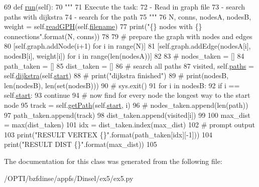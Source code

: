 \begin{DoxyCode}
69     \textcolor{keyword}{def }\hyperlink{classex5_1_1Dijsktra_aea7ae3d54e417bfbae33810b4af4b43f}{run}(self):
70         \textcolor{stringliteral}{"""}
71 \textcolor{stringliteral}{        Execute the task:}
72 \textcolor{stringliteral}{        - Read in graph file}
73 \textcolor{stringliteral}{        - search paths with dijkstra}
74 \textcolor{stringliteral}{        - search for the path}
75 \textcolor{stringliteral}{        """}
76         N, conns, nodesA, nodesB, weight = self.\hyperlink{classex5_1_1Dijsktra_a18db63176ac6b4f62a9cdf065ae12059}{readGPH}(self.\hyperlink{classex5_1_1Dijsktra_a8dbe32a7b317f625e654e87934e5200d}{filename})
77         print(\textcolor{stringliteral}{"\{\} nodes with \{\} connections"}.format(N, conns))
78 
79         \textcolor{comment}{# prepare the graph with nodes and edges}
80         [self.graph.addNode(i+1) \textcolor{keywordflow}{for} i \textcolor{keywordflow}{in} range(N)]
81         [self.graph.addEdge(nodesA[i], nodesB[i], weight[i]) \textcolor{keywordflow}{for} i \textcolor{keywordflow}{in} range(len(nodesA))]
82 
83         \textcolor{comment}{# nodes\_taken = []}
84         path\_taken = []
85         dist\_taken = []
86         \textcolor{comment}{# search all paths}
87         visited, self.\hyperlink{classex5_1_1Dijsktra_a8f901f6dee7ce81c439c4752b9947164}{paths} = self.\hyperlink{classex5_1_1Dijsktra_aee756193b4ffa1f19d0d815c382e9f5c}{dijkstra}(self.\hyperlink{classex5_1_1Dijsktra_a49d81cee4303a19a8c88e556ef6f5220}{start})
88         \textcolor{comment}{# print("dijkstra finished")}
89         \textcolor{comment}{# print(nodesB, len(nodesB), len(set(nodesB)))}
90         \textcolor{comment}{# sys.exit()}
91         \textcolor{keywordflow}{for} i \textcolor{keywordflow}{in} nodesB:
92             \textcolor{keywordflow}{if} i == self.\hyperlink{classex5_1_1Dijsktra_a49d81cee4303a19a8c88e556ef6f5220}{start}:
93                 \textcolor{keywordflow}{continue}
94             \textcolor{comment}{# now find for every node the longest way to the start node}
95             track = self.\hyperlink{classex5_1_1Dijsktra_ac7a2651336adf722eb4ce920736d2ff1}{getPath}(self.\hyperlink{classex5_1_1Dijsktra_a49d81cee4303a19a8c88e556ef6f5220}{start}, i)
96             \textcolor{comment}{# nodes\_taken.append(len(path))}
97             path\_taken.append(track)
98             dist\_taken.append(visited[i])
99 
100         max\_dist = max(dist\_taken)
101         idx = dist\_taken.index(max\_dist)
102         \textcolor{comment}{# prompt output}
103         print(\textcolor{stringliteral}{"RESULT VERTEX \{\}"}.format(path\_taken[idx][-1]))
104         print(\textcolor{stringliteral}{"RESULT DIST \{\}"}.format(max\_dist))
105 
\end{DoxyCode}


The documentation for this class was generated from the following file\+:\begin{DoxyCompactItemize}
\item 
/\+O\+P\+T\+I/bzfdinse/appfs/\+Dinsel/ex5/ex5.\+py\end{DoxyCompactItemize}
